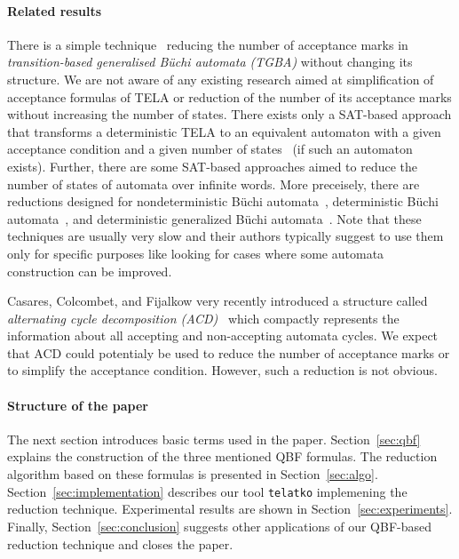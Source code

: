 \documentclass[a4paper,UKenglish,cleveref,autoref,thm-restate]{lipics-v2021}
\newcommand{\telatko}{\texttt{telatko}\xspace}
\begin{document}
\paragraph*{Related results}
There is a simple technique~\cite{babiak.13.spin} reducing the number
of acceptance marks in \emph{transition-based generalised Büchi
  automata (TGBA)} without changing its structure. We are not aware
of any existing research aimed at simplification of acceptance
formulas of TELA or reduction of the number of its acceptance marks
without increasing the number of states. There exists only a SAT-based
approach that transforms a deterministic TELA to an
equivalent automaton with a given acceptance condition and a given
number of states~\cite{baarir.15.lpar} (if such an automaton
exists). Further, there are some SAT-based approaches aimed to reduce
the number of states of automata over infinite words. More preceisely,
there are reductions designed for nondeterministic Büchi
automata~\cite{ehlers.10.spin}, deterministic Büchi
automata~\cite{ehlers.10.sat}, and deterministic generalized Büchi
automata~\cite{baarir.14.forte}. Note that these techniques are
usually very slow and their authors typically suggest to use them only
for specific purposes like looking for cases where some automata
construction can be improved.

Casares, Colcombet, and Fijalkow very recently introduced a structure
called \emph{alternating cycle decomposition
  (ACD)}~\cite{casares.21.icalp} which compactly represents the
information about all accepting and non-accepting automata cycles. We
expect that ACD could potentialy be used to reduce the number of
acceptance marks or to simplify the acceptance condition. However,
such a reduction is not obvious.

\paragraph*{Structure of the paper} The next section introduces basic
terms used in the paper. Section~\ref{sec:qbf} explains the
construction of the three mentioned QBF formulas. The reduction algorithm
based on these formulas is presented in
Section~\ref{sec:algo}. Section~\ref{sec:implementation} describes our
tool \telatko implemening the reduction technique.
Experimental results are shown in
Section~\ref{sec:experiments}. Finally, Section~\ref{sec:conclusion}
suggests other applications of our QBF-based reduction technique and
closes the paper.
\end{document}
